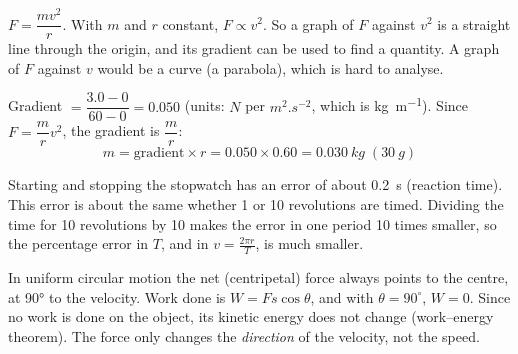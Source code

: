 \documentclass[12pt]{article}
\begin{document}
\ansq
{}
\begin{crit}
\end{crit}
\sample
$F = \dfrac{mv^2}{r}$. With $m$ and $r$ constant, $F \propto v^2$. So a graph of $F$ against $v^2$ is
a straight line through the origin, and its gradient can be used to find a quantity. A graph of $F$
against $v$ would be a curve (a parabola), which is hard to analyse.
\begin{crit}
\end{crit}
\sample
Gradient $= \dfrac{3.0 - 0}{60 - 0} = 0.050$ (units: $\si{N}$ per $\si{m^2.s^{-2}}$, which is
\si{kg.m^{-1}}). Since $F = \dfrac{m}{r}v^2$, the gradient is $\dfrac{m}{r}$:
\[ m = \text{gradient} \times r = 0.050 \times 0.60 = \qty{0.030}{kg} \;(\qty{30}{g}) \]
\begin{crit}
\end{crit}
\sample
Starting and stopping the stopwatch has an error of about \qty{0.2}{s} (reaction time). This error is
about the same whether 1 or 10 revolutions are timed. Dividing the time for 10 revolutions by 10
makes the error in one period 10 times smaller, so the percentage error in $T$, and in
$v = \frac{2\pi r}{T}$, is much smaller.

\ansq
\begin{crit}
\end{crit}
\sample
In uniform circular motion the net (centripetal) force always points to the centre, at \ang{90} to the
velocity. Work done is $W = Fs\cos\theta$, and with $\theta = 90^\circ$, $W = 0$. Since no work is
done on the object, its kinetic energy does not change (work--energy theorem). The force only changes
the \emph{direction} of the velocity, not the speed.
\end{document}
